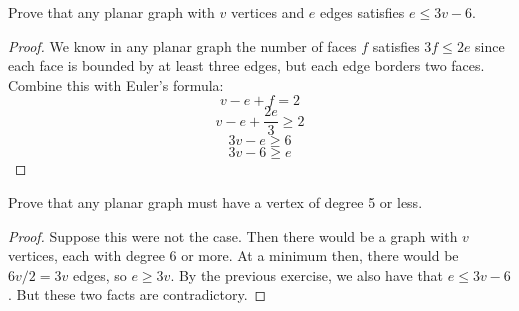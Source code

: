 \begin{questions}
\question Prove that any planar graph with $v$ vertices and $e$ edges satisfies $e \le 3v - 6$.

	\begin{answer}
		\begin{proof}
		We know in any planar graph the number of faces $f$ satisfies $3f \le 2e$ since each face is bounded by at least three edges, but each edge borders two faces.  Combine this with Euler's formula:
				\[v - e + f = 2\]
				\[v - e + \frac{2e}{3} \ge 2\]
				\[3v - e \ge 6\]
				\[3v - 6 \ge e\]		
		\end{proof}
		
	\end{answer}

	
	
\question Prove that any planar graph must have a vertex of degree 5 or less.

	\begin{answer}
		\begin{proof}
		 Suppose this were not the case.  Then there would be a graph with $v$ vertices, each with degree 6 or more.  At a minimum then, there would be $6v/2 = 3v$ edges, so $e \ge 3v$.  By the previous exercise, we also have that $e \le 3v - 6$.  But these two facts are contradictory.
		 \end{proof}
	\end{answer}






\end{questions}